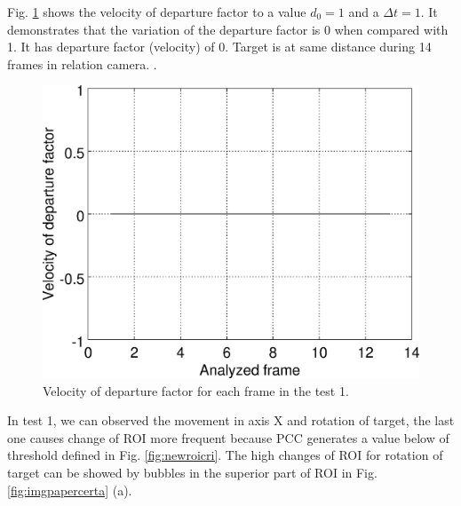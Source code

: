 Fig. \ref{fig:res_graph1v} shows the velocity of departure factor
to a value $d_0=1$ and a $\Delta t=1$. It demonstrates that the variation
of the departure factor is 0 when compared with 1. 
It has departure factor (velocity) of $0$. Target is at same distance 
during 14 frames in relation camera.
.
\begin{figure}[H]
\centering
\includegraphics[width=0.8\columnwidth]{images/results2D_graphv.eps}
\caption{Velocity of departure factor for each frame in the test 1.}
\label{fig:res_graph1v}
\end{figure}

In test 1, we can observed the movement in axis X and rotation of target, the last one causes change of ROI more frequent
because PCC generates a value below of threshold defined in Fig. \ref{fig:newroicri}.
The high changes of ROI for rotation of target can be showed by bubbles in the superior part of ROI in Fig. 
\ref{fig:imgpapercerta} (a).
